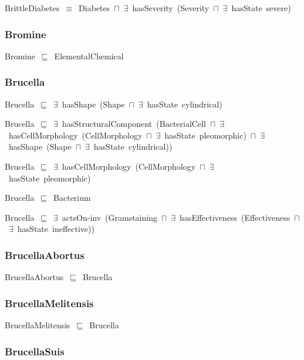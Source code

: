 \documentclass{article}
\begin{document}
BrittleDiabetes~\ensuremath{\equiv}~Diabetes~\ensuremath{\sqcap}~\ensuremath{\exists}~hasSeverity~(Severity~\ensuremath{\sqcap}~\ensuremath{\exists}~hasState~severe)

\subsubsection*{Bromine}

Bromine~\ensuremath{\sqsubseteq}~ElementalChemical~

\subsubsection*{Brucella}

Brucella~\ensuremath{\sqsubseteq}~\ensuremath{\exists}~hasShape~(Shape~\ensuremath{\sqcap}~\ensuremath{\exists}~hasState~cylindrical)~

Brucella~\ensuremath{\sqsubseteq}~\ensuremath{\exists}~hasStructuralComponent~(BacterialCell~\ensuremath{\sqcap}~\ensuremath{\exists}~hasCellMorphology~(CellMorphology~\ensuremath{\sqcap}~\ensuremath{\exists}~hasState~pleomorphic)~\ensuremath{\sqcap}~\ensuremath{\exists}~hasShape~(Shape~\ensuremath{\sqcap}~\ensuremath{\exists}~hasState~cylindrical))~

Brucella~\ensuremath{\sqsubseteq}~\ensuremath{\exists}~hasCellMorphology~(CellMorphology~\ensuremath{\sqcap}~\ensuremath{\exists}~hasState~pleomorphic)~

Brucella~\ensuremath{\sqsubseteq}~Bacterium~

Brucella~\ensuremath{\sqsubseteq}~\ensuremath{\exists}~actsOn-inv~(Gramstaining~\ensuremath{\sqcap}~\ensuremath{\exists}~hasEffectiveness~(Effectiveness~\ensuremath{\sqcap}~\ensuremath{\exists}~hasState~ineffective))~

\subsubsection*{BrucellaAbortus}

BrucellaAbortus~\ensuremath{\sqsubseteq}~Brucella~

\subsubsection*{BrucellaMelitensis}

BrucellaMelitensis~\ensuremath{\sqsubseteq}~Brucella~

\subsubsection*{BrucellaSuis}
\end{document}
